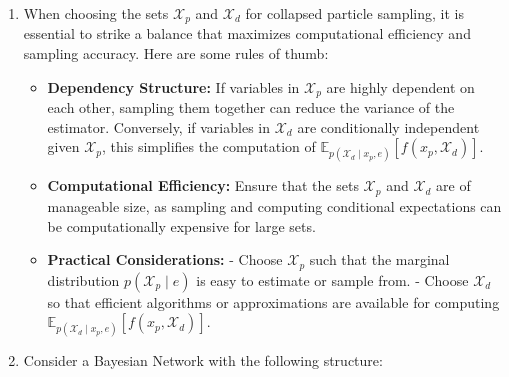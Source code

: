 \documentclass[a4 paper]{article}
\begin{document}
\begin{enumerate}
    \item {}
    
    When choosing the sets \( \mathcal{X}_p \) and \( \mathcal{X}_d \) for collapsed particle sampling, it is essential to strike a balance that maximizes computational efficiency and sampling accuracy. Here are some rules of thumb:

    \begin{itemize}

        \item \textbf{Dependency Structure:} 
        If variables in \( \mathcal{X}_p \) are highly dependent on each other, sampling them together can reduce the variance of the estimator.
        Conversely, if variables in \( \mathcal{X}_d \) are conditionally independent given \( \mathcal{X}_p \), this simplifies the computation of \( \mathbb{E}_{p(\mathcal{X}_d \mid x_p, e)} [f(x_p, \mathcal{X}_d)] \).
    
        \item \textbf{Computational Efficiency:}
        Ensure that the sets \( \mathcal{X}_p \) and \( \mathcal{X}_d \) are of manageable size, as sampling and computing conditional expectations can be computationally expensive for large sets.
    
        \item \textbf{Practical Considerations:}
        - Choose \( \mathcal{X}_p \) such that the marginal distribution \( p(\mathcal{X}_p \mid e) \) is easy to estimate or sample from.
        - Choose \( \mathcal{X}_d \) so that efficient algorithms or approximations are available for computing \( \mathbb{E}_{p(\mathcal{X}_d \mid x_p, e)} [f(x_p, \mathcal{X}_d)] \).
    
    \end{itemize}



    \item {}
    



Consider a Bayesian Network with the following structure:

\begin{center}
\end{center}
\end{enumerate}
\end{document}
